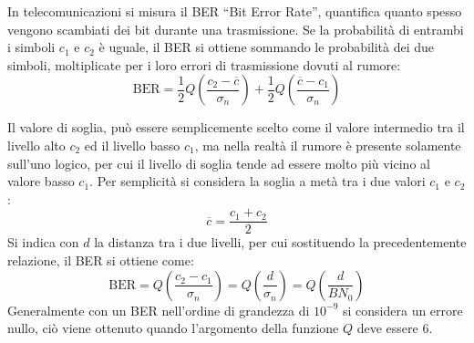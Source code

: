 \documentclass{article}
\numberwithin{equation}{subsection}
\begin{document}
In telecomunicazioni si misura il BER ``Bit Error Rate'', quantifica quanto spesso vengono scambiati dei bit durante una trasmissione. Se la probabilità di entrambi 
i simboli $c_1$ e $c_2$ è uguale, il BER si ottiene sommando le probabilità dei due simboli, moltiplicate per i loro errori di trasmissione dovuti al rumore:
\begin{equation*}
    \mathrm{BER}=\displaystyle\frac{1}{2}Q\left(\frac{c_2-\overline{c}}{\sigma_n}\right)+\frac{1}{2}Q\left(\frac{\overline{c}-c_1}{\sigma_n}\right)
\end{equation*}

Il valore di soglia, può essere semplicemente scelto come il valore intermedio tra il livello alto $c_2$ ed il livello basso $c_1$, ma nella realtà il rumore è presente 
solamente sull'uno logico, per cui il livello di soglia tende ad essere molto più vicino al valore basso $c_1$. Per semplicità si considera la soglia a metà tra i due 
valori $c_1$ e $c_2$:
\begin{equation}
    \overline{c}=\displaystyle\frac{c_1+c_2}{2}
\end{equation}
Si indica con $d$ la distanza tra i due livelli, per cui sostituendo la precedentemente relazione, il BER si ottiene come:
\begin{equation}
    \mathrm{BER}=Q\left(\frac{c_2-c_1}{\sigma_n}\right)=Q\left(\frac{d}{\sigma_n}\right)=Q\left(\frac{d}{BN_0}\right)
\end{equation}
Generalmente con un BER nell'ordine di grandezza di $10^{-9}$ si considera un errore nullo, ciò viene ottenuto quando l'argomento della funzione $Q$ deve essere $6$. 
\end{document}
